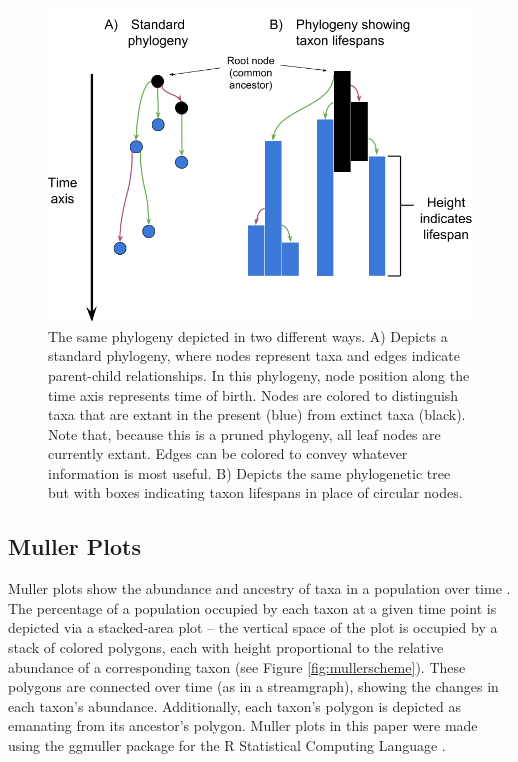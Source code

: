 \documentclass[letterpaper]{article}
\begin{document}
\begin{figure}
    \centering
    \includegraphics[width=\linewidth]{figs/Phylogenyschematic.png}
    \caption{\small The same phylogeny depicted in two different ways. A) Depicts a standard phylogeny, where nodes represent taxa and edges indicate parent-child relationships. In this phylogeny, node position along the time axis represents time of birth. Nodes are colored to distinguish taxa that are extant in the present (blue) from extinct taxa (black). Note that, because this is a pruned phylogeny, all leaf nodes are currently extant. Edges can be colored to convey whatever information is most useful. B) Depicts the same phylogenetic tree but with boxes indicating taxon lifespans in place of circular nodes.}
    \label{fig:phyloschme}
\end{figure}


\subsection{Muller Plots}

Muller plots show the abundance and ancestry of taxa in a population over time \citep{muller_mullerplot_1932, maddamsetti_adaptation_2015}. The percentage of a population occupied by each taxon at a given time point is depicted via a stacked-area plot -- the vertical space of the plot is occupied by a stack of colored polygons, each with height proportional to the relative abundance of a corresponding taxon (see Figure \ref{fig:mullerscheme}). These polygons are connected over time (as in a streamgraph), showing the changes in each taxon's abundance. Additionally, each taxon's polygon is depicted as emanating from its ancestor's polygon. Muller plots in this paper were made using the ggmuller package \citep{noble_ggmuller_2017} for the R Statistical Computing Language \citep{r_core_team_r:_2017}.
\end{document}

